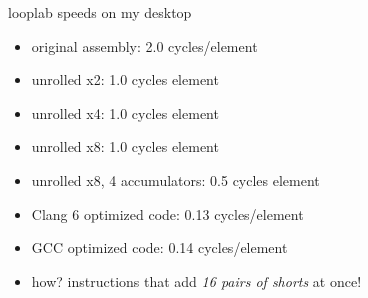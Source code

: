 \begin{frame}{looplab speeds on my desktop}
    \begin{itemize}
    \item original assembly: 2.0 cycles/element
    \item unrolled x2: 1.0 cycles element
    \item unrolled x4: 1.0 cycles element
    \item unrolled x8: 1.0 cycles element
    \item unrolled x8, 4 accumulators: 0.5 cycles element
    \vspace{.5cm}
    \item<2-> Clang 6 optimized code: 0.13 cycles/element
    \item<2-> GCC optimized code: 0.14 cycles/element
    \vspace{.5cm}
    \item<3-> how? instructions that add \textit{16 pairs of shorts} at once!
    \end{itemize}
\end{frame}

